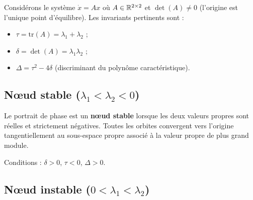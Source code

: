 Consid\'erons le syst\`eme $\dot{x} = Ax$ o\`u $A \in \mathbb{R}^{2\times 2}$ et
$\det(A) \neq 0$ (l'origine est l'unique point d'\'equilibre). Les invariants
pertinents sont :
\begin{itemize}
    \item $\tau = \mathrm{tr}(A) = \lambda_1 + \lambda_2$ ;
    \item $\delta = \det(A) = \lambda_1 \lambda_2$ ;
    \item $\Delta = \tau^2 - 4\delta$ (discriminant du polyn\^ome caract\'eristique).
\end{itemize}

\subsection{N\oe ud stable ($\lambda_1 < \lambda_2 < 0$)}

\begin{definition}[N\oe ud stable]
Le portrait de phase est un \textbf{n\oe ud stable} lorsque les deux valeurs
propres sont r\'eelles et strictement n\'egatives. Toutes les orbites
convergent vers l'origine tangentiellement au sous-espace propre associ\'e \`a
la valeur propre de plus grand module.
\end{definition}

Conditions : $\delta > 0$, $\tau < 0$, $\Delta > 0$.

\begin{center}
\end{center}

\subsection{N\oe ud instable ($0 < \lambda_1 < \lambda_2$)}

